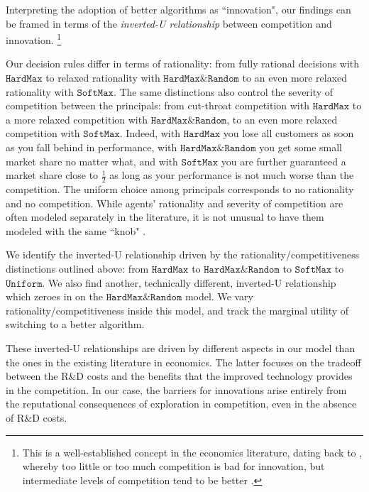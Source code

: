 \documentclass[10pt]{article}
\newcommand{\term}[1]{\ensuremath{\mathtt{#1}}\xspace}
\newcommand{\HardMax}{\term{HardMax}}
\newcommand{\HardMaxRandom}{\term{HardMax\&Random}}
\newcommand{\SoftMaxRandom}{\term{SoftMax}}
\newcommand{\Uniform}{\term{Uniform}}
\begin{document}
Interpreting the adoption of better algorithms as ``innovation", our findings can be framed in terms of the \emph{inverted-U relationship} between competition and innovation.%
\footnote{This is a well-established concept in the economics literature, dating back to \cite{Schumpeter-42}, whereby too little or too much competition is bad for innovation, but intermediate levels of competition tend to be better \citep[\eg][]{aghion2005competition,Vives-08}.}

Our decision rules differ in terms of rationality: from fully rational decisions with \HardMax to relaxed rationality with \HardMaxRandom to an even more relaxed rationality with \SoftMaxRandom. The same distinctions also control the severity of competition between the principals: from cut-throat competition with \HardMax to a more relaxed competition with \HardMaxRandom, to an even more relaxed competition with \SoftMaxRandom. Indeed, with \HardMax you lose all customers as soon as you fall behind in performance, with \HardMaxRandom you get some small market share no matter what, and with \SoftMaxRandom you are further guaranteed a market share close to $\tfrac12$ as long as your performance is not much worse than the competition. The uniform choice among principals corresponds to no rationality and no competition. While agents' rationality and severity of competition are often modeled separately in the literature, it is not unusual to have them modeled with the same ``knob" \cite[\eg][]{Gabaix-16}.


We identify the inverted-U relationship driven by the rationality/competitiveness distinctions outlined above: from \HardMax to \HardMaxRandom to \SoftMaxRandom to \Uniform. We also find another, technically different, inverted-U relationship which zeroes in on the \HardMaxRandom model. We vary rationality/competitiveness inside this model, and track the marginal utility of switching to a better algorithm.

These inverted-U relationships are driven by different aspects in our model than the ones in the existing literature in economics. The latter focuses on the tradeoff between the R\&D costs and the benefits that the improved technology provides in the competition. In our case, the barriers for innovations arise entirely from the reputational consequences of exploration in competition, even in the absence of R\&D costs.
\end{document}
